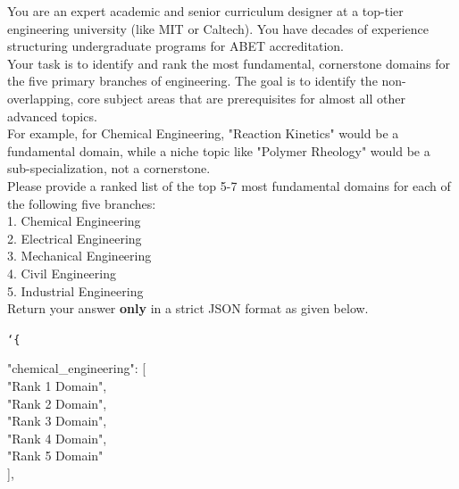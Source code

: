 \begin{tcolorbox}[
    colback=gray!5,
    colframe=gray!40,
    boxrule=0.4pt,
    arc=2pt,
    left=6pt,
    right=6pt,
    top=6pt,
    bottom=6pt,
    breakable
]
\ttfamily\small
You are an expert academic and senior curriculum designer at a top-tier engineering university (like MIT or Caltech). You have decades of experience structuring undergraduate programs for ABET accreditation. \\

Your task is to identify and rank the most fundamental, cornerstone
domains for the five primary branches of engineering. The goal is to identify the non-overlapping, core subject areas that are prerequisites for almost all other advanced topics. \\

For example, for Chemical Engineering, "Reaction Kinetics" would be a fundamental domain, while a niche topic like "Polymer Rheology" would be a sub-specialization, not a cornerstone. \\

Please provide a ranked list of the top 5-7 most fundamental domains for each of the following five branches: \\
1. Chemical Engineering \\
2. Electrical Engineering \\
3. Mechanical Engineering \\
4. Civil Engineering \\
5. Industrial Engineering \\

Return your answer \textbf{only} in a strict JSON format as given below.

\vspace{8pt}
\noindent\bgroup\ttfamily
\texttt{\char`\{}

\vspace{8pt}
\hspace*{1em}"chemical\_engineering": [\\
\hspace*{2em}"Rank 1 Domain",\\
\hspace*{2em}"Rank 2 Domain",\\
\hspace*{2em}"Rank 3 Domain",\\
\hspace*{2em}"Rank 4 Domain",\\
\hspace*{2em}"Rank 5 Domain"\\
\hspace*{1em}],\\


\end{tcolorbox}
